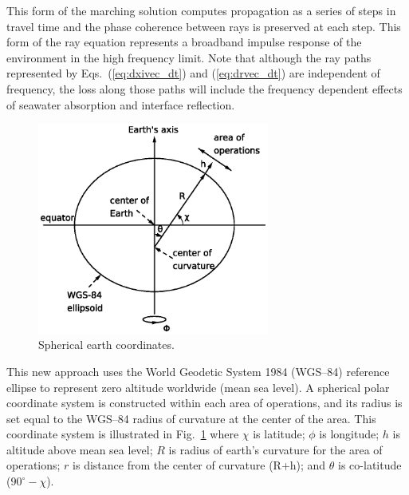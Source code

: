 \documentclass{ws-jca}
\begin{document}
This form of the marching solution computes propagation as a series of
steps in travel time and the phase coherence between rays is preserved at
each step. This form of the ray equation represents a broadband impulse
response of the environment in the high frequency limit. Note that although
the ray paths represented by Eqs.~(\ref{eq:dxivec_dt}) and
(\ref{eq:drvec_dt}) are independent of frequency, the loss along those
paths will include the frequency dependent effects of seawater absorption
and interface reflection.

\begin{figure}[th]
	\centerline{\includegraphics[width=3in]{SphericalEarthCoordinates.eps}} 
	\vspace*{8pt}
	\caption{Spherical earth coordinates.}
	\label{fig:earth}
\end{figure}

This new approach uses the World Geodetic System 1984 (WGS--84)\cite{WGS84} reference ellipse to represent zero altitude worldwide (mean sea level). A
spherical polar coordinate system is constructed within each area of
operations, and its radius is set equal to the WGS--84 radius of curvature
at the center of the area. This coordinate system is illustrated in
Fig.~\ref{fig:earth} 
where 
\(\chi\) is latitude;
\(\phi\) is longitude; 
$h$ is altitude above mean sea level;
$R$ is radius of earth's curvature for the area of operations;
$r$ is distance from the center of curvature (R+h); and 
\(\theta\) is co-latitude (\(90^\circ-\chi\)).
\end{document}
